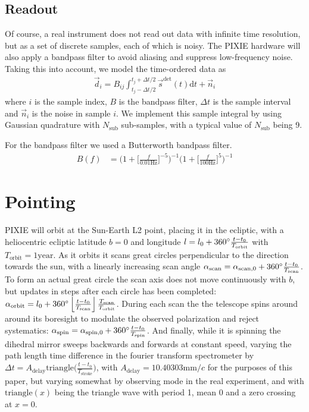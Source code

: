 \documentclass{article}
\begin{document}
\subsection{Readout}
Of course, a real instrument does not read out data with infinite
time resolution, but as a set of discrete samples, each of which is
noisy. The PIXIE hardware will also apply a bandpass filter to avoid
aliasing and suppress low-frequency noise. Taking this into account,
we model the time-ordered data as
\begin{align}
	\vec d_i = B_{ij} \int_{t_j-\Delta t/2}^{t_j+\Delta t/2} \vec s^\textrm{det}(t) \textrm{d}t + \vec n_i
\end{align}
where $i$ is the sample index, $B$ is the bandpass filter, $\Delta t$ is the sample
interval and $\vec n_i$ is the noise in sample $i$. We implement this
sample integral by using Gaussian quadrature with $N_\textrm{sub}$ sub-samples,
with a typical value of $N_\textrm{sub}$ being 9.

For the bandpass filter we used a Butterworth bandpass filter.
\begin{align}
	B(f) &= \Big(1+\Big[\frac{f}{0.01\textrm{Hz}}\Big]^{-5}\Big)^{-1}
		\Big(1+\Big[\frac{f}{100\textrm{Hz}}\Big]^{5}\Big)^{-1}
\end{align}

\section{Pointing}
\label{sec:pointing}
PIXIE will orbit at the Sun-Earth L2 point, placing it in the ecliptic, with
a heliocentric ecliptic latitude $b=0$ and longitude $l=l_0 +
360\degree\frac{t-t_0}{T_\textrm{orbit}}$ with $T_\textrm{orbit} = 1\textrm{year}$.
As it orbits it scans great circles
perpendicular to the direction towards the sun, with a linearly increasing scan angle
$\alpha_\textrm{scan} = \alpha_{\textrm{scan},0} + 360\degree \frac{t-t_0}{T_\textrm{scan}}$.
To form an actual great circle the scan axis does not
move continuously with $b$, but updates in steps after each circle has been completed:
$\alpha_\textrm{orbit} = l_0 + 360\degree\left\lfloor\frac{t-t_0}{T_\textrm{scan}}\right\rfloor\frac{T_\textrm{scan}}{T_\textrm{orbit}}$.
During each scan the the telescope spins around around its boresight to modulate
the observed polarization and reject systematics: $\alpha_\textrm{spin} =
\alpha_{\textrm{spin},0} + 360\degree\frac{t-t_0}{T_\textrm{spin}}$. And finally,
while it is spinning the dihedral mirror sweeps backwards and forwards at constant
speed, varying the path length time difference in the fourier transform spectrometer
by $\Delta t = A_\textrm{delay}\textrm{triangle}\Big(\frac{t-t_0}{T_\textrm{stroke}}\Big)$,
with $A_\textrm{delay} = 10.40303 \textrm{mm}/c$ for the purposes of this paper, but
varying somewhat by observing mode in the real experiment, and with
$\textrm{triangle}(x)$ being the triangle wave with period 1, mean 0 and a zero
crossing at $x=0$.
\end{document}
